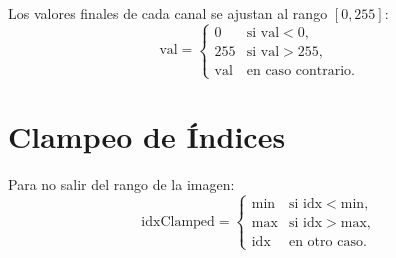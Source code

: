 \documentclass[11pt]{article}
\begin{document}
Los valores finales de cada canal se ajustan al rango \([0, 255]\):
\[
\text{val} = 
\begin{cases}
0 & \text{si } \text{val} < 0,\\
255 & \text{si } \text{val} > 255,\\
\text{val} & \text{en caso contrario}.
\end{cases}
\]

\section{Clampeo de Índices}

Para no salir del rango de la imagen:
\[
\text{idxClamped} = 
\begin{cases}
\text{min} & \text{si } \text{idx} < \text{min},\\
\text{max} & \text{si } \text{idx} > \text{max},\\
\text{idx} & \text{en otro caso}.
\end{cases}
\]
\end{document}
